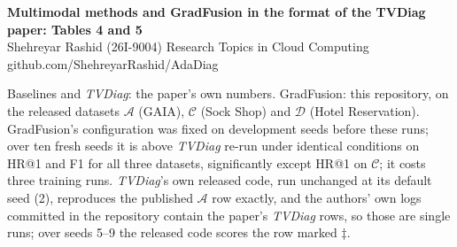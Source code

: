\documentclass[10pt]{article}
\begin{document}
\begin{center}
{\large\textbf{Multimodal methods and GradFusion in the format of the TVDiag paper: Tables 4 and 5}}\\[2pt]
{\small Shehreyar Rashid (26I-9004) \quad Research Topics in Cloud Computing \quad
github.com/ShehreyarRashid/AdaDiag}
\end{center}
\noindent\small Baselines and \textit{TVDiag}: the paper's own numbers. GradFusion: this
repository, on the released datasets $\mathcal{A}$ (GAIA), $\mathcal{C}$ (Sock Shop) and
$\mathcal{D}$ (Hotel Reservation). GradFusion's configuration was fixed on development seeds before these runs; over ten fresh seeds it is above \textit{TVDiag} re-run under identical conditions on HR@1 and F1 for all three datasets, significantly except HR@1 on $\mathcal{C}$; it costs three training runs. \textit{TVDiag}'s own released code, run unchanged at its default seed (2), reproduces the published $\mathcal{A}$ row exactly, and the authors' own logs committed in the repository contain the paper's \textit{TVDiag} rows, so those are single runs; over seeds 5--9 the released code scores the row marked $\ddagger$.
\normalsize


\end{document}
